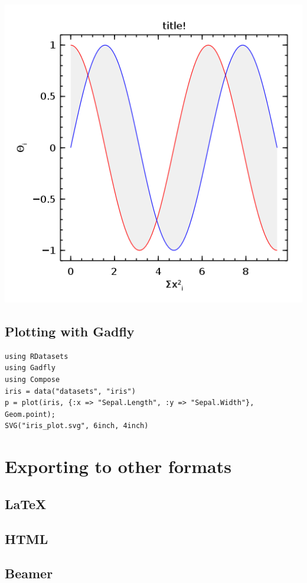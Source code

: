 \documentclass[11pt]{article}
\begin{document}
\includegraphics[width=.9\linewidth]{example1.png}

\subsection{Plotting with Gadfly}
\label{sec-5-2}

\begin{verbatim}
using RDatasets
using Gadfly
using Compose
iris = data("datasets", "iris")
p = plot(iris, {:x => "Sepal.Length", :y => "Sepal.Width"}, Geom.point);
SVG("iris_plot.svg", 6inch, 4inch)
\end{verbatim}
\section{Exporting to other formats}
\label{sec-6}

\subsection{\LaTeX{}}
\label{sec-6-1}

\subsection{HTML}
\label{sec-6-2}

\subsection{Beamer}
\label{sec-6-3}
\end{document}

